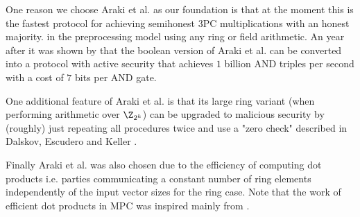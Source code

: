 

One reason we choose Araki et al. \cite{CCS:AFLNO16} as our foundation
is that at the moment this is the fastest protocol for achieving semihonest
3PC multiplications with an honest majority.
in the preprocessing model using any ring or field arithmetic.
An year after it was shown by \cite{SP:ABFLLN17} that the
boolean version of Araki et al. can be
converted into a protocol with active security that achieves $1$ billion AND
triples per second with a cost of $7$ bits per AND gate.

One additional feature of Araki et al. \cite{CCS:AFLNO16} is that
its large ring variant (when performing arithmetic over $\Z_{2^k}$)
can be upgraded to malicious security by (roughly) just repeating all
procedures twice and use a "zero check" described in Dalskov, Escudero and
Keller \cite{cryptoeprint:2020:1330}.

Finally Araki et al. was also chosen due to the efficiency of computing dot products
i.e. parties
  communicating a constant number of ring elements independently of the input vector sizes
  for the ring case. Note that the work of efficient dot products in MPC was inspired mainly from
  \cite{CCS:LinNof17,C:CGHIKL18,EPRINT:ADEN19,cryptoeprint:2020:1330}.


